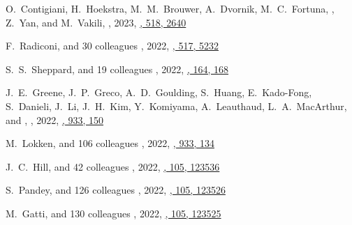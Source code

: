 \begin{etaremune}
\item
O.~Contigiani, H.~Hoekstra, M.~M.~Brouwer, A.~Dvornik, M.~C.~Fortuna, \myself, Z.~Yan, and M.~Vakili,
,
2023, \href{https://ui.adsabs.harvard.edu/abs/2023MNRAS.518.2640C}{\mnras, 518, 2640}


\item
F.~Radiconi, and 30 colleagues
,
2022, \href{https://ui.adsabs.harvard.edu/abs/2022MNRAS.517.5232R}{\mnras, 517, 5232}

\item
S.~S.~Sheppard, and 19 colleagues
,
2022, \href{https://ui.adsabs.harvard.edu/abs/2022AJ....164..168S}{\aj, 164, 168}

\item
J.~E.~Greene, J.~P.~Greco, A.~D.~Goulding, S.~Huang, E.~Kado-Fong, S.~Danieli, J.~Li, J.~H.~Kim, Y.~Komiyama, A.~Leauthaud, L.~A.~MacArthur, and \myself,
,
2022, \href{https://ui.adsabs.harvard.edu/abs/2022ApJ...933..150G}{\apj, 933, 150}

\item
M.~Lokken, and 106 colleagues
,
2022, \href{https://ui.adsabs.harvard.edu/abs/2022ApJ...933..134L}{\apj, 933, 134}

\item
J.~C.~Hill, and 42 colleagues
,
2022, \href{https://ui.adsabs.harvard.edu/abs/2022PhRvD.105l3536H}{\prd, 105, 123536}

\item
S.~Pandey, and 126 colleagues
,
2022, \href{https://ui.adsabs.harvard.edu/abs/2022PhRvD.105l3526P}{\prd, 105, 123526}

\item
M.~Gatti, and 130 colleagues
,
2022, \href{https://ui.adsabs.harvard.edu/abs/2022PhRvD.105l3525G}{\prd, 105, 123525}


\end{etaremune}
